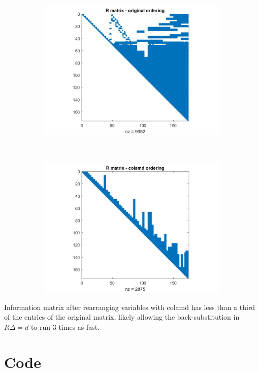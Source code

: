 \documentclass[a4paper]{scrreprt}
\begin{document}
\chapter{}
\begin{figure}[h]
	\centering
	\begin{subfigure}[t]{.7\textwidth}
		\centering
		\includegraphics[width=\linewidth]{original_R.jpg}
		\caption{}
	\end{subfigure}
	\\
	\begin{subfigure}[t]{.7\textwidth}
		\centering
		\includegraphics[width=\linewidth]{new_R.jpg}
		\caption{}
	\end{subfigure}	
\end{figure}
Information matrix after rearranging variables with colamd has less than a third of the entries of the original matrix, likely allowing the back-substitution in $R\Delta =d$ to run 3 times as fast. 

\chapter{Code}


\end{document}
